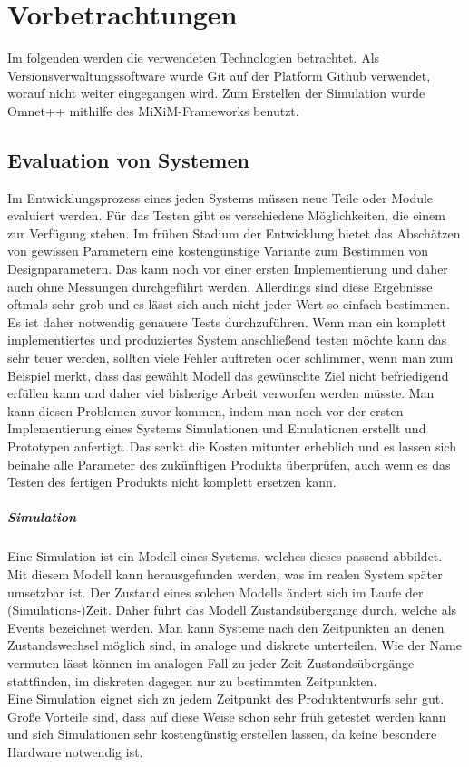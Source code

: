 \chapter{Vorbetrachtungen}

Im folgenden werden die verwendeten Technologien betrachtet. Als Versionsverwaltungssoftware wurde Git\cite{git} auf der Platform Github\cite{github} verwendet, worauf nicht weiter eingegangen wird. Zum Erstellen der Simulation wurde Omnet++\cite{omnet} mithilfe des MiXiM-Frameworks\cite{mixim} benutzt.

\section{Evaluation von Systemen}

Im Entwicklungsprozess eines jeden Systems müssen neue Teile oder Module evaluiert werden. Für das Testen gibt es verschiedene Möglichkeiten, die einem zur Verfügung stehen. Im frühen Stadium der Entwicklung bietet das Abschätzen von gewissen Parametern eine kostengünstige Variante zum Bestimmen von Designparametern. Das kann noch vor einer ersten Implementierung und daher auch ohne Messungen durchgeführt werden. Allerdings sind diese Ergebnisse oftmals sehr grob und es lässt sich auch nicht jeder Wert so einfach bestimmen. \newline
Es ist daher notwendig genauere Tests durchzuführen. Wenn man ein komplett implementiertes und produziertes System anschließend testen möchte kann das sehr teuer werden, sollten viele Fehler auftreten oder schlimmer, wenn man zum Beispiel merkt, dass das gewählt Modell das gewünschte Ziel nicht befriedigend erfüllen kann und daher viel bisherige Arbeit verworfen werden müsste. \newline
Man kann diesen Problemen zuvor kommen, indem man noch vor der ersten Implementierung eines Systems Simulationen und Emulationen erstellt und Prototypen anfertigt. Das senkt die Kosten mitunter erheblich und es lassen sich beinahe alle Parameter des zukünftigen Produkts überprüfen, auch wenn es das Testen des fertigen Produkts nicht komplett ersetzen kann.

\paragraph{Simulation}

Eine Simulation ist ein Modell eines Systems, welches dieses passend abbildet. Mit diesem Modell kann herausgefunden werden, was im realen System später umsetzbar ist. Der Zustand eines solchen Modells ändert sich im Laufe der (Simulations-)Zeit. Daher führt das Modell Zustandsübergange durch, welche als Events bezeichnet werden. Man kann Systeme nach den Zeitpunkten an denen Zustandswechsel möglich sind, in analoge und diskrete unterteilen. Wie der Name vermuten lässt können im analogen Fall zu jeder Zeit Zustandsübergänge stattfinden, im diskreten dagegen nur zu bestimmten Zeitpunkten.\\
Eine Simulation eignet sich zu jedem Zeitpunkt des Produktentwurfs sehr gut. Große Vorteile sind, dass auf diese Weise schon sehr früh getestet werden kann und sich Simulationen sehr kostengünstig erstellen lassen, da keine besondere Hardware notwendig ist.

